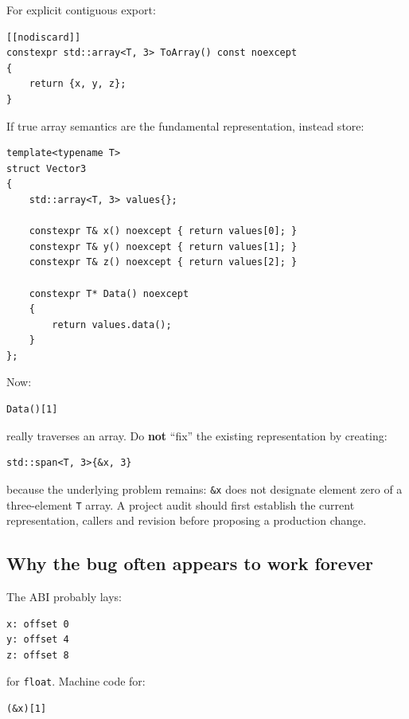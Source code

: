 For explicit contiguous export:

\begin{verbatim}
[[nodiscard]]
constexpr std::array<T, 3> ToArray() const noexcept
{
    return {x, y, z};
}
\end{verbatim}

If true array semantics are the fundamental representation, instead store:

\begin{verbatim}
template<typename T>
struct Vector3
{
    std::array<T, 3> values{};

    constexpr T& x() noexcept { return values[0]; }
    constexpr T& y() noexcept { return values[1]; }
    constexpr T& z() noexcept { return values[2]; }

    constexpr T* Data() noexcept
    {
        return values.data();
    }
};
\end{verbatim}

Now:

\begin{verbatim}
Data()[1]
\end{verbatim}

really traverses an array. Do \textbf{not} ``fix'' the existing representation by creating:

\begin{verbatim}
std::span<T, 3>{&x, 3}
\end{verbatim}

because the underlying problem remains: \texttt{\&x} does not designate element zero of a three-element \texttt{T} array. A project audit should first establish the current representation, callers and revision before proposing a production change.

\subsection{Why the bug often appears to work forever}\label{01-foundations-i-ch003-why-the-bug-often-appears-to-work-forever}

The ABI probably lays:

\begin{verbatim}
x: offset 0
y: offset 4
z: offset 8
\end{verbatim}

for \texttt{float}. Machine code for:

\begin{verbatim}
(&x)[1]
\end{verbatim}


